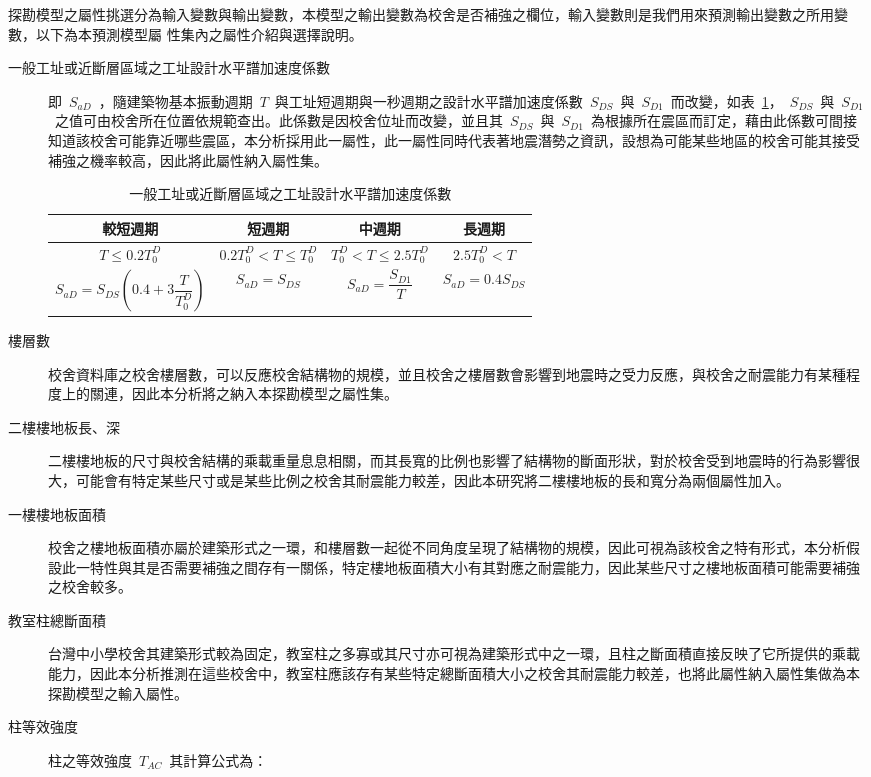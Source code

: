 探勘模型之屬性挑選分為輸入變數與輸出變數，本模型之輸出變數為校舍是否補強之欄位，輸入變數則是我們用來預測輸出變數之所用變數，以下為本預測模型屬 性集內之屬性介紹與選擇說明。

\begin{description}
  \item [一般工址或近斷層區域之工址設計水平譜加速度係數]
  \cite{內政部營建署編輯委員會2005建築物耐震設計規範及解說} 即~$S_{aD}$~，隨建築物基本振動週期~$T$~與工址短週期與一秒週期之設計水平譜加速度係數~$S_{DS}$~與~$S_{D1}$~而改變，如表~\ref{tab:sad}，~$S_{DS}$~與~$S_{D1}$~之值可由校舍所在位置依規範查出。此係數是因校舍位址而改變，並且其~$S_{DS}$~與~$S_{D1}$~為根據所在震區而訂定，藉由此係數可間接知道該校舍可能靠近哪些震區，本分析採用此一屬性，此一屬性同時代表著地震潛勢之資訊，設想為可能某些地區的校舍可能其接受補強之機率較高，因此將此屬性納入屬性集。

{\renewcommand{\arraystretch}{1.5}
\begin{table}[hbtp]
  \begin{center}
    \caption{一般工址或近斷層區域之工址設計水平譜加速度係數}
    \label{tab:sad}
    \begin{tabular}{c c c c}
      \hline
       較短週期 & 短週期 & 中週期 & 長週期 \\
      \hline
       $T \leq 0.2 T^D_0$ &  $0.2 T^D_0 < T \leq T^D_0$ & $T^D_0 < T \leq 2.5 T^D_0$  & $2.5 T^D_0 < T$  \\
       $ S_{aD} = S_{DS}(0.4 + 3 \dfrac{T}{T^D_0}) $ & $ S_{aD} = S_{DS} $ & $ S_{aD} = \dfrac{S_{D1}}{T} $ & $ S_{aD} = 0.4 S_{DS} $ \\
      \hline
      \end{tabular}
  \end{center}
\end{table}
}


  \item [樓層數]
  校舍資料庫之校舍樓層數，可以反應校舍結構物的規模，並且校舍之樓層數會影響到地震時之受力反應，與校舍之耐震能力有某種程度上的關連，因此本分析將之納入本探勘模型之屬性集。
  \item [二樓樓地板長、深]
  二樓樓地板的尺寸與校舍結構的乘載重量息息相關，而其長寬的比例也影響了結構物的斷面形狀，對於校舍受到地震時的行為影響很大，可能會有特定某些尺寸或是某些比例之校舍其耐震能力較差，因此本研究將二樓樓地板的長和寬分為兩個屬性加入。
  \item [一樓樓地板面積]
  校舍之樓地板面積亦屬於建築形式之一環，和樓層數一起從不同角度呈現了結構物的規模，因此可視為該校舍之特有形式，本分析假設此一特性與其是否需要補強之間存有一關係，特定樓地板面積大小有其對應之耐震能力，因此某些尺寸之樓地板面積可能需要補強之校舍較多。
  \item [教室柱總斷面積]
  台灣中小學校舍其建築形式較為固定，教室柱之多寡或其尺寸亦可視為建築形式中之一環，且柱之斷面積直接反映了它所提供的乘載能力，因此本分析推測在這些校舍中，教室柱應該存有某些特定總斷面積大小之校舍其耐震能力較差，也將此屬性納入屬性集做為本探勘模型之輸入屬性。
  \item [柱等效強度]
  柱之等效強度~$T_{AC}$~其計算公式為：


\end{description}
